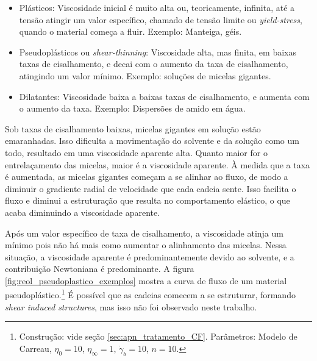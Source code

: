 			\begin{itemize}[noitemsep]
				\item Plásticos: Viscosidade inicial é muito alta ou, teoricamente, infinita, até a tensão atingir um valor específico, chamado de tensão limite ou \emph{yield-stress}, quando o material começa a fluir. Exemplo: Manteiga, géis.
				\item Pseudoplásticos ou \emph{shear-thinning}: Viscosidade alta, mas finita, em baixas taxas de cisalhamento, e decai com o aumento da taxa de cisalhamento, atingindo um valor mínimo. Exemplo: soluções de micelas gigantes.
				\item Dilatantes: Viscosidade baixa a baixas taxas de cisalhamento, e aumenta com o aumento da taxa. Exemplo: Dispersões de amido em água.
			\end{itemize}
			
			
			Sob taxas de cisalhamento baixas, micelas gigantes em solução estão emaranhadas. Isso dificulta a movimentação do solvente e da solução como um todo, resultado em uma viscosidade aparente alta. Quanto maior for o entrelaçamento das micelas, maior é a viscosidade aparente.    À medida que a taxa é aumentada, as micelas gigantes começam a se alinhar ao fluxo, de modo a diminuir o gradiente radial de velocidade que cada cadeia sente. Isso facilita o fluxo e diminui a estruturação que resulta no comportamento elástico, o que acaba diminuindo a viscosidade aparente.
			
			Após um valor específico de taxa de cisalhamento, a viscosidade atinja um mínimo pois não há mais como aumentar o alinhamento das micelas. Nessa situação, a viscosidade aparente é predominantemente devido ao solvente, e a contribuição Newtoniana é predominante. A figura \ref{fig:reol_pseudoplastico_exemplos} mostra a curva de fluxo de um material pseudoplástico.\footnote{Construção: vide seção \ref{sec:apn_tratamento_CF}. Parâmetros: Modelo de Carreau, \(\eta_0=10\), \(\eta_{\infty}=1\), \(\dot{\gamma}_b=10\), \(n=10\).} É possível que as cadeias comecem a se estruturar, formando \emph{shear induced structures}, mas isso não foi observado neste trabalho. 
	
